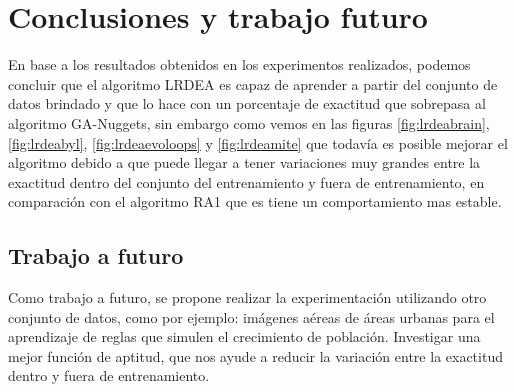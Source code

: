\chapter{Conclusiones y trabajo futuro}
En base a los resultados obtenidos en los experimentos realizados, podemos concluir que el algoritmo LRDEA es capaz de aprender a partir del conjunto de datos brindado y que lo hace con un porcentaje de exactitud que sobrepasa al algoritmo GA-Nuggets, sin embargo como vemos en las figuras \ref{fig:lrdeabrain}, \ref{fig:lrdeabyl}, \ref{fig:lrdeaevoloops} y \ref{fig:lrdeamite} que todavía es posible mejorar el algoritmo debido a que puede llegar a tener variaciones muy grandes entre la exactitud dentro del conjunto del entrenamiento y fuera de entrenamiento, en comparación con el algoritmo RA1 que es tiene un comportamiento mas estable. 

\section{Trabajo a futuro}

Como trabajo a futuro, se propone realizar la experimentación utilizando otro conjunto de datos, como por ejemplo: imágenes aéreas de áreas urbanas para el aprendizaje de reglas que simulen el crecimiento de población. Investigar una mejor función de aptitud, que nos ayude a reducir la variación entre la exactitud dentro y fuera de entrenamiento.